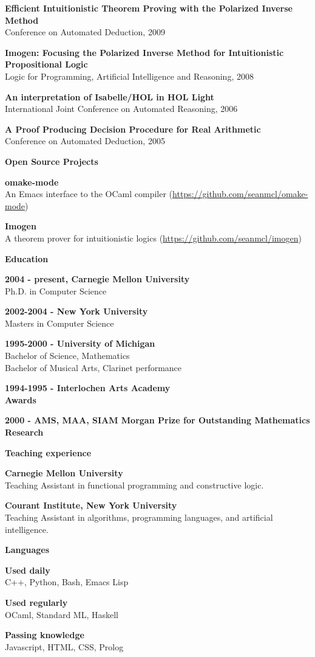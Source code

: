 \documentclass[a4paper,12pt,final]{memoir}
\newcommand{\SmallSep}{\vspace{0.5em}}
\newcommand{\CVSection}[1]
{\Large\textbf{#1}\par
  \SmallSep\normalsize\normalfont}
\newcommand{\CVItem}[1]
{\textbf{\color{RoyalBlue} #1}}
\newcommand{\CPP}{C\hspace{-2pt}+\hspace{-4pt}+}
\begin{document}
\CVItem{Efficient Intuitionistic Theorem Proving with the Polarized Inverse Method}\\
Conference on Automated Deduction, 2009
\SmallSep

\CVItem{Imogen: Focusing the Polarized Inverse Method for Intuitionistic Propositional Logic}\\
Logic for Programming, Artificial Intelligence and Reasoning, 2008
\SmallSep

\CVItem{An interpretation of Isabelle/HOL in HOL Light}\\
International Joint Conference on Automated Reasoning, 2006
\SmallSep

\CVItem{A Proof Producing Decision Procedure for Real Arithmetic}\\
Conference on Automated Deduction, 2005
\SmallSep

\CVSection{Open Source Projects}
\CVItem{omake-mode}\\
An Emacs interface to the OCaml compiler (\url{https://github.com/seanmcl/omake-mode})
\SmallSep

\CVItem{Imogen}\\
A theorem prover for intuitionistic logics (\url{https://github.com/seanmcl/imogen})
\SmallSep

\CVSection{Education}
\CVItem{2004 - present, Carnegie Mellon University}\\
Ph.D. in Computer Science
\SmallSep

\CVItem{2002-2004 - New York University}\\
Masters in Computer Science
\SmallSep

\CVItem{1995-2000 - University of Michigan}\\
Bachelor of Science, Mathematics \\
Bachelor of Musical Arts, Clarinet performance \\
\SmallSep

\CVItem{1994-1995 - Interlochen Arts Academy}\\

\CVSection{Awards}
\CVItem{2000 - AMS, MAA, SIAM Morgan Prize for Outstanding Mathematics Research}
\SmallSep

\CVSection{Teaching experience}

\CVItem{Carnegie Mellon University}\\
Teaching Assistant in functional programming and constructive logic.
\SmallSep

\CVItem{Courant Institute, New York University}\\
Teaching Assistant in algorithms, programming languages, and
artificial intelligence.
\SmallSep

\CVSection{Languages}

\CVItem{Used daily}\\
 \CPP, Python, Bash, Emacs Lisp
\SmallSep

\CVItem{Used regularly}\\
OCaml, Standard ML, Haskell
\SmallSep

\CVItem{Passing knowledge}\\
Javascript, HTML, CSS, Prolog
\SmallSep
\end{document}
